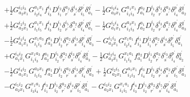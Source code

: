 \documentclass[aip,onecolumn,preprint]{revtex4-1}
\begin{document}
\begin{align}
  & + {{{\frac{1}{2}}}{G^{{i_5}{i_3}}_{{a_2}{x_1}}}{G^{{a_1}{x_1}}_{{i_2}{i_4}}}{f^{{i_1}}_{{i_3}}}{D^{{i_2}}_{{i_1}}}{\delta^{{a_2}}_{r^\prime}}{\delta^{{i_4}}_{s^\prime}}{\delta^{p^\prime}_{{i_5}}}{\delta^{q^\prime}_{{a_1}}}} - {{{\frac{1}{2}}}{G^{{i_2}{i_4}}_{{a_3}{x_1}}}{G^{{a_1}{x_1}}_{{i_1}{i_3}}}{f^{{a_2}}_{{a_1}}}{D^{{i_1}}_{{i_2}}}{\delta^{{i_3}}_{r^\prime}}{\delta^{{a_3}}_{s^\prime}}{\delta^{p^\prime}_{{i_4}}}{\delta^{q^\prime}_{{a_2}}}} \nonumber \\
  & + {{{\frac{1}{2}}}{G^{{i_2}{i_3}}_{{a_2}{x_1}}}{G^{{a_1}{x_1}}_{{i_1}{i_5}}}{f^{{i_4}}_{{i_3}}}{D^{{i_1}}_{{i_2}}}{\delta^{{i_5}}_{r^\prime}}{\delta^{{a_2}}_{s^\prime}}{\delta^{p^\prime}_{{i_4}}}{\delta^{q^\prime}_{{a_1}}}} - {{{\frac{1}{2}}}{G^{{i_2}{i_4}}_{{a_1}{x_1}}}{G^{{a_3}{x_1}}_{{i_1}{i_3}}}{f^{{a_1}}_{{a_2}}}{D^{{i_1}}_{{i_2}}}{\delta^{{i_3}}_{r^\prime}}{\delta^{{a_2}}_{s^\prime}}{\delta^{p^\prime}_{{i_4}}}{\delta^{q^\prime}_{{a_3}}}} \nonumber \\
  & - {{{\frac{1}{2}}}{G^{{i_2}{i_4}}_{{a_1}{x_1}}}{G^{{x_1}{a_3}}_{{i_1}{i_3}}}{f^{{a_1}}_{{a_2}}}{D^{{i_1}}_{{i_2}}}{\delta^{{a_2}}_{r^\prime}}{\delta^{{i_3}}_{s^\prime}}{\delta^{p^\prime}_{{i_4}}}{\delta^{q^\prime}_{{a_3}}}} - {{G^{{i_5}{i_3}}_{{a_2}{x_1}}}{G^{{x_1}{a_1}}_{{i_2}{i_4}}}{f^{{i_1}}_{{i_3}}}{D^{{i_2}}_{{i_1}}}{\delta^{{a_2}}_{r^\prime}}{\delta^{{i_4}}_{s^\prime}}{\delta^{p^\prime}_{{i_5}}}{\delta^{q^\prime}_{{a_1}}}} \nonumber \\
  & + {{G^{{i_4}{i_2}}_{{a_1}{x_1}}}{G^{{x_1}{a_3}}_{{i_1}{i_3}}}{f^{{a_1}}_{{a_2}}}{D^{{i_1}}_{{i_2}}}{\delta^{{a_2}}_{r^\prime}}{\delta^{{i_3}}_{s^\prime}}{\delta^{p^\prime}_{{i_4}}}{\delta^{q^\prime}_{{a_3}}}} - {{{\frac{1}{2}}}{G^{{i_2}{i_4}}_{{a_3}{x_1}}}{G^{{x_1}{a_1}}_{{i_1}{i_3}}}{f^{{a_2}}_{{a_1}}}{D^{{i_1}}_{{i_2}}}{\delta^{{a_3}}_{r^\prime}}{\delta^{{i_3}}_{s^\prime}}{\delta^{p^\prime}_{{i_4}}}{\delta^{q^\prime}_{{a_2}}}} \nonumber \\
  & - {{{\frac{1}{2}}}{G^{{i_4}{i_2}}_{{a_1}{x_1}}}{G^{{a_3}{x_1}}_{{i_1}{i_3}}}{f^{{a_1}}_{{a_2}}}{D^{{i_1}}_{{i_2}}}{\delta^{{a_2}}_{r^\prime}}{\delta^{{i_3}}_{s^\prime}}{\delta^{p^\prime}_{{i_4}}}{\delta^{q^\prime}_{{a_3}}}} + {{{\frac{1}{2}}}{G^{{i_2}{i_5}}_{{a_2}{x_1}}}{G^{{a_1}{x_1}}_{{i_1}{i_3}}}{f^{{i_3}}_{{i_4}}}{D^{{i_1}}_{{i_2}}}{\delta^{{i_4}}_{r^\prime}}{\delta^{{a_2}}_{s^\prime}}{\delta^{p^\prime}_{{i_5}}}{\delta^{q^\prime}_{{a_1}}}} \nonumber \\
  & - {{G^{{i_5}{i_2}}_{{a_2}{x_1}}}{G^{{x_1}{a_1}}_{{i_3}{i_4}}}{f^{{i_3}}_{{i_1}}}{D^{{i_1}}_{{i_2}}}{\delta^{{a_2}}_{r^\prime}}{\delta^{{i_4}}_{s^\prime}}{\delta^{p^\prime}_{{i_5}}}{\delta^{q^\prime}_{{a_1}}}} - {{G^{{i_3}{i_2}}_{{a_2}{x_1}}}{G^{{x_1}{a_1}}_{{i_1}{i_5}}}{f^{{i_4}}_{{i_3}}}{D^{{i_1}}_{{i_2}}}{\delta^{{a_2}}_{r^\prime}}{\delta^{{i_5}}_{s^\prime}}{\delta^{p^\prime}_{{i_4}}}{\delta^{q^\prime}_{{a_1}}}} \nonumber \\

\end{align}
\end{document}
